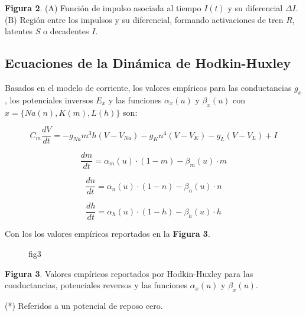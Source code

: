 \documentclass[11pt]{article}
\begin{document}
    \textbf{Figura 2}. (A) Función de impulso asociada al tiempo \(I(t)\) y
su diferencial \(\Delta I\). (B) Región entre los impulsos y su
diferencial, formando activaciones de tren \(R\), latentes \(S\) o
decadentes \(I\).

    \subsection{Ecuaciones de la Dinámica de
Hodkin-Huxley}\label{ecuaciones-de-la-dinuxe1mica-de-hodkin-huxley}

Basados en el modelo de corriente, los valores empíricos para las
conductancias \(g_x\), los potenciales inversos \(E_x\) y las funciones
\(\alpha_x(u)\) y \(\beta_x(u)\) con \(x = \{Na (n), K (m), L (h)\}\)
son:

\[
C_m \frac{d V}{d t} = -g_{Na} m^3 h (V - V_{Na}) - g_K n^4 (V - V_K) - g_L (V - V_L) + I
\]

\[
\frac{d m}{d t} = \alpha_m(u) \cdot (1 - m) - \beta_m(u) \cdot m
\]

\[
\frac{d n}{d t} = \alpha_n(u) \cdot (1 - n) - \beta_n(u) \cdot n
\]

\[
\frac{d h}{d t} = \alpha_h(u) \cdot (1 - h) - \beta_h(u) \cdot h
\]

Con los los valores empíricos reportados en la \textbf{Figura 3}.

    \begin{figure}
\centering
{}
\caption{fig3}
\end{figure}

    \textbf{Figura 3}. Valores empíricos reportados por Hodkin-Huxley para
las conductancias, potenciales reversos y las funciones \(\alpha_x(u)\)
y \(\beta_x(u)\).

(*) Referidos a un potencial de reposo cero.
\end{document}
